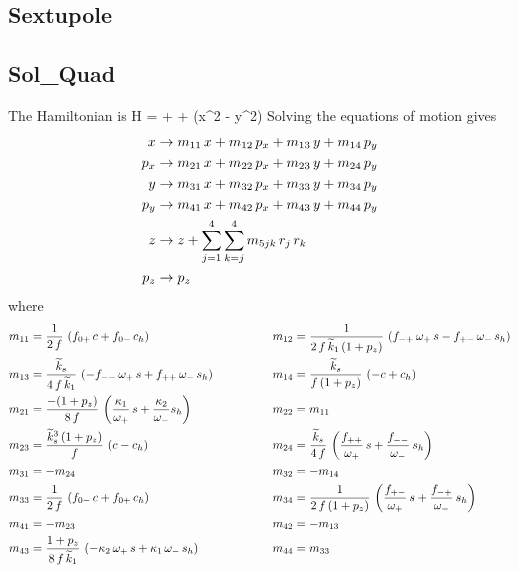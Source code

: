 \documentclass{book}
\begin{document}
\subsection{Sextupole}

\subsection{Sol\_Quad}

The Hamiltonian is
\Begineq
  H =  + 
   +  (x^2 - y^2)
\Endeq
Solving the equations of motion gives
\begin{align}
  x   &\rightarrow m_{11} \, x + m_{12} \, p_x + m_{13} \, y + m_{14} \, p_y \nonumber \\
  p_x &\rightarrow m_{21} \, x + m_{22} \, p_x + m_{23} \, y + m_{24} \, p_y \nonumber \\
  y   &\rightarrow m_{31} \, x + m_{32} \, p_x + m_{33} \, y + m_{34} \, p_y \nonumber \\
  p_y &\rightarrow m_{41} \, x + m_{42} \, p_x + m_{43} \, y + m_{44} \, p_y \nonumber \\
  z   &\rightarrow z + \sum_{j = 1}^4 \sum_{k = j}^4 m_{5jk} \, r_j \, r_k  \nonumber \\
  p_z &\rightarrow p_z \nonumber
\end{align}
where
\begin{alignat}{2}
  m_{11} &= \frac{1}{2 \, f} \, \left( f_{0+} \, c + f_{0-} \, c_h \right) & \qquad \qquad
  m_{12} &= \frac{1}{2 \, f \, \widetilde k_1 \, (1 + p_z)} \, 
            \left( f_{-+} \, \omega_+ \,  s - f_{+-} \, \omega_- \, s_h \right) \nonumber \\
  m_{13} &= \frac{\widetilde k_s}{4 \, f \, \widetilde k_1} \, 
            \left( -f_{--} \, \omega_+ \, s + f_{++} \, \omega_- \, s_h \right) & \qquad \qquad
  m_{14} &= \frac{\widetilde k_s}{f \, (1 + p_z)} \, \left( -c + c_h \right) \nonumber \\
  m_{21} &= \frac{-(1 + p_z)}{8 \, f} \, 
            \left( \frac{\kappa_1}{\omega_+} \, s + \frac{\kappa_2}{\omega_-} s_h \right) & \qquad \qquad
  m_{22} &= m_{11} \\
  m_{23} &= \frac{\widetilde k_s^3 \, (1 + p_z)}{f} \, \left( c - c_h \right) & \qquad \qquad
  m_{24} &= \frac{\widetilde k_s}{4 \, f} \, 
            \left( \frac{f_{++}}{\omega_+} \, s + \frac{f_{--}}{\omega_-} \, s_h \right) \nonumber \\
  m_{31} &= -m_{24} & \qquad \qquad
  m_{32} &= -m_{14} \nonumber \\
  m_{33} &= \frac{1}{2 \, f} \, \left( f_{0-} \, c + f_{0+} \, c_h \right) & \qquad \qquad
  m_{34} &= \frac{1}{2 \, f \, (1 + p_z)} \, 
            \left( \frac{f_{+-}}{\omega_+} \, s + \frac{f_{-+}}{\omega_-} \, s_h \right) \nonumber \\
  m_{41} &= -m_{23} & \qquad \qquad
  m_{42} &= -m_{13} \nonumber \\
  m_{43} &= \frac{1 + p_z}{8 \, f \, \widetilde k_1} \, 
            \left( -\kappa_2 \, \omega_+ \, s + \kappa_1 \, \omega_- \, s_h \right) & \qquad \qquad
  m_{44} &= m_{33} \nonumber
\end{alignat}
\end{document}
